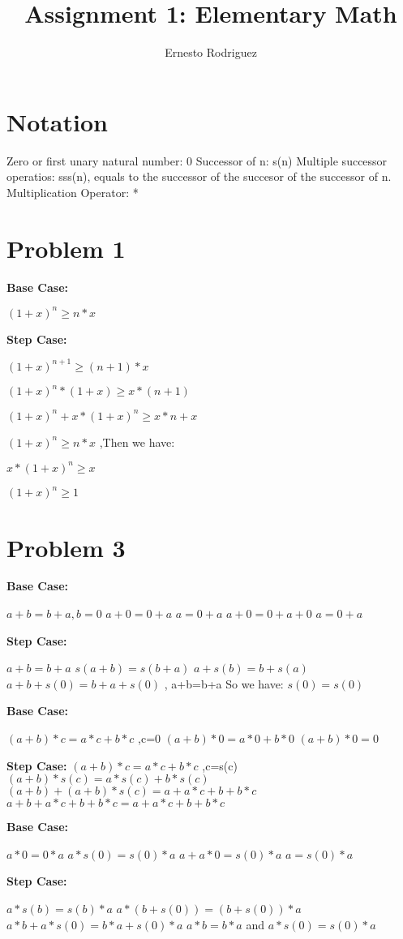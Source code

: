 \documentclass{article}
\title{Assignment 1: Elementary Math}
\author{Ernesto Rodriguez}
\begin{document}
\maketitle

\section{Notation}

Zero or first unary natural number: 0
Successor of n: s(n)
Multiple successor operatios: sss(n), equals to the successor of the succesor of the successor of n.
Multiplication Operator: *

\section{Problem 1}

{\bf Base Case:}

$(1+x)^n \ge n * x$

{\bf Step Case:}

$(1+x)^{n+1} \ge (n+1) * x$ 

$(1+x)^n * (1+x) \ge x * (n+1) $ 

$(1+x)^n + x * (1+x)^n \ge x * n + x $ 

$ (1+x)^n \ge n * x $ ,Then we have:

$x * (1+x)^n \ge x $

$ (1+x)^n \ge 1 $

\section{Problem 3}

\begin{enumerate}

  {\item {\bf Base Case:}

    $a + b = b + a, b=0$ 
    $a+0=0+a$ 
    $a=0+a$ 
    $a+0=0+a+0$
    $a=0+a$ 

    {\bf Step Case: }

    $a+b=b+a$
    $s(a+b)=s(b+a)$
    $a+s(b)=b+s(a)$
    $a+b+s(0)=b+a+s(0)$ , a+b=b+a So we have: 
    $s(0)=s(0)$
    }

  {\item {\bf Base Case:} 

    $(a+b) * c = a*c + b*c$ ,c=0
    $(a+b) * 0 = a*0 + b*0$
    $(a+b) * 0 = 0$

    {\bf Step Case:}
    $(a+b) * c = a*c + b*c$ ,c=s(c)
    $(a+b) * s(c) = a*s(c) + b*s(c)$
    $(a+b) + (a+b)*s(c) = a + a*c + b + b*c$
    $a+b+a*c+b+b*c=a+a*c+b+b*c$
    }

  {\item {\bf Base Case:}

    $a*0=0*a$
    $a*s(0)=s(0)*a$
    $a+a*0=s(0)*a$
    $a=s(0)*a$

    {\bf Step Case:}

    $a*s(b)=s(b)*a$
    $a*(b+s(0))=(b+s(0))*a$
    $a*b + a*s(0)=b*a +s(0)*a$
    $a*b=b*a$ and $a*s(0)=s(0)*a$
    
  }

  \end{enumerate}
\end{document}
